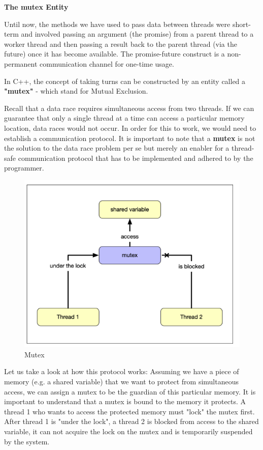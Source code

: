 \documentclass[11pt, a4paper]{article}
\begin{document}
\textbf{The mutex Entity}

Until now, the methods we have used to pass data between threads were short-term and involved passing an argument (the promise) from a parent thread to a worker thread and then passing a result back to the parent thread (via the future) once it has become available. The promise-future construct is a non-permanent communication channel for one-time usage.

In C++, the concept of taking turns can be constructed by an entity called a \textbf{"mutex"} - which stand for Mutual Exclusion.


Recall that a data race requires simultaneous access from two threads. If we can guarantee that only a single thread at a time can access a particular memory location, data races would not occur. In order for this to work, we would need to establish a communication protocol. It is important to note that a \textbf{mutex} is not the solution to the data race problem per se but merely an enabler for a thread-safe communication protocol that has to be implemented and adhered to by the programmer.



\begin{figure}[htpb!]
	\centering
	\includegraphics[width=0.8\linewidth]{mutex}
	\caption{Mutex}
	\label{fig:mutex}
\end{figure}




Let us take a look at how this protocol works: Assuming we have a piece of memory (e.g. a shared variable) that we want to protect from simultaneous access, we can assign a mutex to be the guardian of this particular memory. It is important to understand that a mutex is bound to the memory it protects. A thread 1 who wants to access the protected memory must "lock" the mutex first. After thread 1 is "under the lock", a thread 2 is blocked from access to the shared variable, it can not acquire the lock on the mutex and is temporarily suspended by the system.
\end{document}
